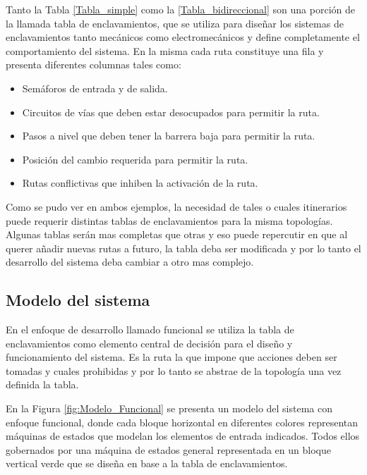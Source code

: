 	\vspace{5cm}
	
	Tanto la Tabla \ref{Tabla_simple} como la \ref{Tabla_bidireccional} son una porción de la llamada tabla de enclavamientos, que se utiliza para diseñar los sistemas de enclavamientos tanto mecánicos como electromecánicos y define completamente el comportamiento del sistema. En la misma cada ruta constituye una fila y presenta diferentes columnas tales como:
	
	\begin{itemize}
		\item Semáforos de entrada y de salida.
		\item Circuitos de vías que deben estar desocupados para permitir la ruta.
		\item Pasos a nivel que deben tener la barrera baja para permitir la ruta.
		\item Posición del cambio requerida para permitir la ruta.
		\item Rutas conflictivas que inhiben la activación de la ruta.
	\end{itemize}
	
	Como se pudo ver en ambos ejemplos, la necesidad de tales o cuales itinerarios puede requerir distintas tablas de enclavamientos para la misma topologías. Algunas tablas serán mas completas que otras y eso puede repercutir en que al querer añadir nuevas rutas a futuro, la tabla deba ser modificada y por lo tanto el desarrollo del sistema deba cambiar a otro mas complejo.
	
	\subsection{Modelo del sistema}
		
		En el enfoque de desarrollo llamado funcional se utiliza la tabla de enclavamientos como elemento central de decisión para el diseño y funcionamiento del sistema. Es la ruta la que impone que acciones deben ser tomadas y cuales prohibidas y por lo tanto se abstrae de la topología una vez definida la tabla.
			
		En la Figura \ref{fig:Modelo_Funcional} se presenta un modelo del sistema con enfoque funcional, donde cada bloque horizontal en diferentes colores representan máquinas de estados que modelan los elementos de entrada indicados. Todos ellos gobernados por una máquina de estados general representada en un bloque vertical verde que se diseña en base a la tabla de enclavamientos. 	
		
